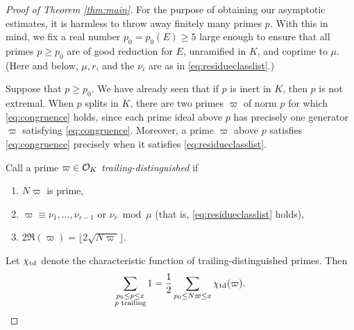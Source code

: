 \documentclass[12pt]{amsart}
\theoremstyle{remark}
\begin{document}

\begin{proof}[Proof of Theorem \ref{thm:main}] For the purpose of obtaining our asymptotic estimates, it is harmless to throw away finitely many primes $p$. With this in mind, we fix a real number $p_0 = p_0(E) \ge 5$ large enough to ensure that all primes $p\ge p_0$ are of good reduction for $E$, unramified in $K$, and coprime to $\mu$. (Here and below, $\mu, r$, and the $\nu_i$ are as in \eqref{eq:residueclasslist}.)

Suppose that $p\ge p_0$. We have already seen that if $p$ is inert in $K$, then $p$ is not extremal. When $p$ splits in $K$, there are two primes $\varpi$ of norm $p$ for which \eqref{eq:congruence} holds, since each prime ideal above $p$ has precisely one generator $\varpi$ satisfying \eqref{eq:congruence}.  Moreover, a prime $\varpi$ above $p$ satisfies \eqref{eq:congruence} precisely when it satisfies \eqref{eq:residueclasslist}. 

Call a prime $\varpi \in \mathcal{O}_K$ \emph{trailing-distinguished} if
\begin{enumerate}
\item $N\varpi$ is prime,
\item $\varpi\equiv \nu_1, \dots, \nu_{r-1}\text{ or } \nu_r\bmod{\mu}$ (that is, \eqref{eq:residueclasslist} holds), 
\item $2\Re(\varpi) = \lfloor 2\sqrt{N\varpi}\rfloor$.
\end{enumerate} 
Let $\chi_{\mathrm{td}}$ denote the characteristic function of trailing-distinguished primes. Then
\begin{equation}\label{eq:trailingcount} \sum_{\substack{p_0 \le p \le x \\ p\text{ trailing}}}1 = \frac{1}{2}\sum_{p_0 \le N\varpi \le x} \chi_{\mathrm{td}}(\varpi). \end{equation}


\end{proof}
\end{document}
